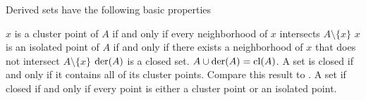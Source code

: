 \begin{proposition}\label{thm:derived_set_properties}
  Derived sets have the following basic properties
  \begin{propenum}
     \( x \) is a cluster point of \( A \) if and only if every neighborhood of \( x \) intersects \( A \setminus \{ x \} \)
     \( x \) is an isolated point of \( A \) if and only if there exists a neighborhood of \( x \) that does not intersect \( A \setminus \{ x \} \)
     \( \operatorname{der}(A) \) is a closed set.
     \( A \cup \operatorname{der}(A) = \operatorname{cl}(A) \).
     A set is closed if and only if it contains all of its cluster points. Compare this result to .
     A set if closed if and only if every point is either a cluster point or an isolated point.
  \end{propenum}
\end{proposition}
